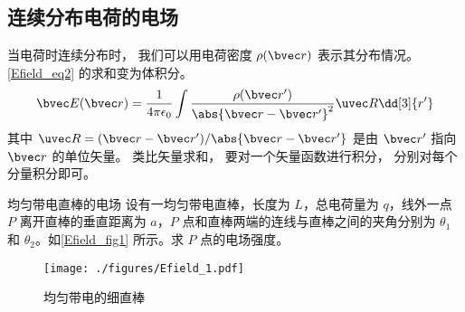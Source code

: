 \subsection{连续分布电荷的电场}
当电荷时连续分布时， 我们可以用电荷密度 $\rho(\bvec r)$ 表示其分布情况。 \autoref{Efield_eq2} 的求和变为体积分。
\begin{equation}\label{Efield_eq9}
\bvec E(\bvec r) = \frac{1}{4\pi\epsilon_0} \int \frac{\rho(\bvec r')}{\abs{\bvec r - \bvec r'}^2} \uvec R \dd[3]{r'}
\end{equation}
其中 $\uvec R = (\bvec r - \bvec r') / \abs{\bvec r - \bvec r'}$ 是由 $\bvec r'$ 指向 $\bvec r$ 的单位矢量。 类比矢量求和， 要对一个矢量函数进行积分， 分别对每个分量积分即可。

\begin{example}{均匀带电直棒的电场}\label{Efield_ex1}
设有一均匀带电直棒，长度为 $L$，总电荷量为 $q$，线外一点 $P$ 离开直棒的垂直距离为 $a$，$P$ 点和直棒两端的连线与直棒之间的夹角分别为 $\theta_1$ 和 $\theta_2$。如\autoref{Efield_fig1} 所示。求 $P$ 点的电场强度。
\begin{figure}[ht]
\centering
\texttt{[image: ./figures/Efield\_1.pdf]}
\caption{均匀带电的细直棒} \label{Efield_fig1}
\end{figure}


\end{example}
